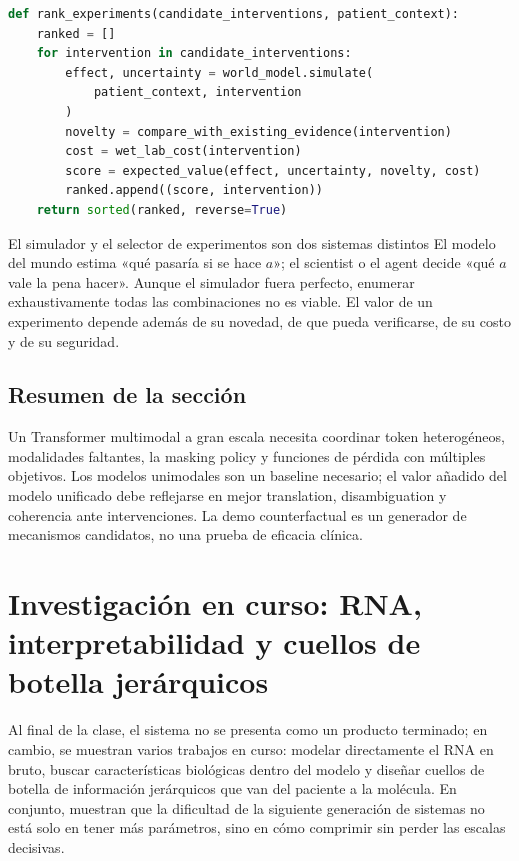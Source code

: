 \documentclass[a4paper]{article}
\begin{document}
\begin{lstlisting}[language=Python,caption={Prioridad de experimentos: considerar a la vez el efecto según el modelo, la incertidumbre y el costo de la validación real}]
def rank_experiments(candidate_interventions, patient_context):
    ranked = []
    for intervention in candidate_interventions:
        effect, uncertainty = world_model.simulate(
            patient_context, intervention
        )
        novelty = compare_with_existing_evidence(intervention)
        cost = wet_lab_cost(intervention)
        score = expected_value(effect, uncertainty, novelty, cost)
        ranked.append((score, intervention))
    return sorted(ranked, reverse=True)
\end{lstlisting}

\begin{importantbox}{El simulador y el selector de experimentos son dos sistemas distintos}
El modelo del mundo estima «qué pasaría si se hace $a$»; el scientist o el agent decide «qué $a$ vale la pena hacer». Aunque el simulador fuera perfecto, enumerar exhaustivamente todas las combinaciones no es viable. El valor de un experimento depende además de su novedad, de que pueda verificarse, de su costo y de su seguridad.
\end{importantbox}

\subsection{Resumen de la sección}

Un Transformer multimodal a gran escala necesita coordinar token heterogéneos, modalidades faltantes, la masking policy y funciones de pérdida con múltiples objetivos. Los modelos unimodales son un baseline necesario; el valor añadido del modelo unificado debe reflejarse en mejor translation, disambiguation y coherencia ante intervenciones. La demo counterfactual es un generador de mecanismos candidatos, no una prueba de eficacia clínica.
\section{Investigación en curso: RNA, interpretabilidad y cuellos de botella jerárquicos}

Al final de la clase, el sistema no se presenta como un producto terminado; en cambio, se muestran varios trabajos en curso: modelar directamente el RNA en bruto, buscar características biológicas dentro del modelo y diseñar cuellos de botella de información jerárquicos que van del paciente a la molécula. En conjunto, muestran que la dificultad de la siguiente generación de sistemas no está solo en tener más parámetros, sino en cómo comprimir sin perder las escalas decisivas.
\end{document}
